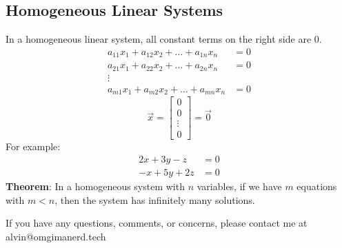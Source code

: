 \documentclass[letterpaper, 12pt]{math}
\begin{document}
\subsection*{Homogeneous Linear Systems}
In a homogeneous linear system, all constant terms on the right side are 0.
\begin{align*}
  a_{11}x_1+a_{12}x_2+\dots+a_{1n}x_n &= 0 \\
  a_{21}x_1+a_{22}x_2+\dots+a_{2n}x_n &= 0 \\
  \vdots \\
  a_{m1}x_1+a_{m2}x_2+\dots+a_{mn}x_n &= 0
\end{align*}
\[ \vec{x} = \begin{bmatrix}0 \\ 0 \\ \vdots \\ 0\end{bmatrix} = \vec{0} \]
For example:
\begin{align*}
  2x+3y-z &= 0 \\
  -x+5y+2z &= 0
\end{align*}
\textbf{Theorem}: In a homogeneous system with \( n \) variables, if we have
\( m \) equations with \( m < n \), then the system has infinitely many
solutions.

\begin{center}
  If you have any questions, comments, or concerns, please contact me at
  alvin@omgimanerd.tech
\end{center}
\end{document}
